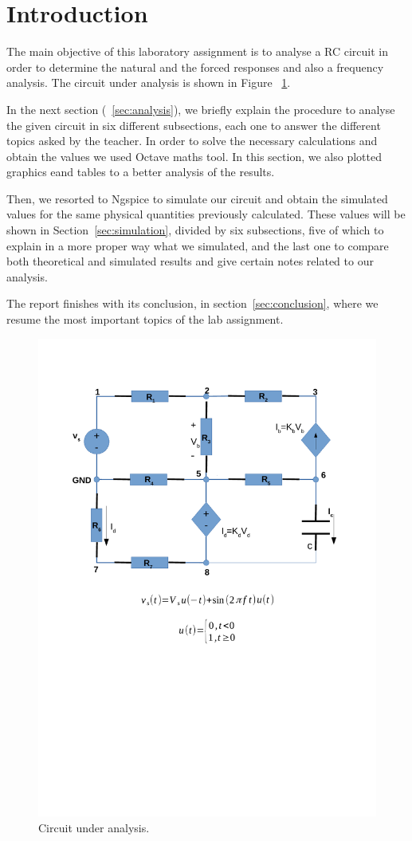 \section{Introduction}
\label{sec:introduction}


The main objective of this laboratory assignment is to analyse a RC circuit in order to determine the natural and the forced responses and also a frequency analysis. The circuit under analysis is shown in Figure ~\ref{fig:circuit}.

In the next section (~\ref{sec:analysis}), we briefly explain the procedure to analyse the given circuit in six different subsections, each one to answer the different topics asked by the teacher. In order to solve the necessary calculations and obtain the values we used Octave maths tool. In this section, we also plotted graphics eand tables to a better analysis of the results.

Then, we resorted to Ngspice to simulate our circuit and obtain the simulated values for the same physical quantities previously calculated. These values will be shown in Section~\ref{sec:simulation}, divided by six subsections, five of which to explain in a more proper way what we simulated, and the last one to compare both theoretical and simulated results and give certain notes related to our analysis.

The report finishes with its conclusion, in section~\ref{sec:conclusion}, where we resume the most important topics of the lab assignment.

\begin{figure}[h] \centering
\includegraphics[width=0.6\linewidth]{circuit.pdf}
\caption{Circuit under analysis.}
\label{fig:circuit}
\end{figure}

